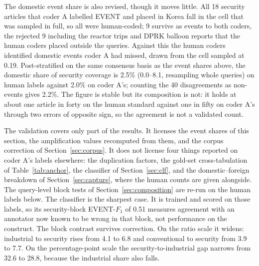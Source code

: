\documentclass[1p,times]{elsarticle}
\begin{document}
The domestic event share is also revised, though it moves little. All 18 security articles that coder A labelled EVENT and placed in Korea fall in the cell that was sampled in full, so all were human-coded; 9 survive as events to both coders, the rejected 9 including the reactor trips and DPRK balloon reports that the human coders placed outside the queries. Against this the human coders identified domestic events coder A had missed, drawn from the cell sampled at 0.19. Post-stratified on the same consensus basis as the event shares above, the domestic share of security coverage is 2.5\% (0.0--8.1, resampling whole queries) on human labels against 2.0\% on coder A's; counting the 40 disagreements as non-events gives 2.2\%. The figure is stable but its composition is not: it holds at about one article in forty on the human standard against one in fifty on coder A's through two errors of opposite sign, so the agreement is not a validated count.

The validation covers only part of the results. It licenses the event shares of this section, the amplification values recomputed from them, and the corpus correction of Section~\ref{sec:corpus}. It does not license four things reported on coder A's labels elsewhere: the duplication factors, the gold-set cross-tabulation of Table~\ref{tab:anchor}, the classifier of Section~\ref{sec:clf}, and the domestic--foreign breakdown of Section~\ref{sec:capture}, where the human counts are given alongside. The query-level block tests of Section~\ref{sec:composition} are re-run on the human labels below. The classifier is the sharpest case. It is trained and scored on those labels, so its security-block EVENT-$F_1$ of 0.51 measures agreement with an annotator now known to be wrong in that block, not performance on the construct. The block contrast survives correction. On the ratio scale it widens: industrial to security rises from 4.1 to 6.8 and conventional to security from 3.9 to 7.7. On the percentage-point scale the security-to-industrial gap narrows from 32.6 to 28.8, because the industrial share also falls.
\end{document}
